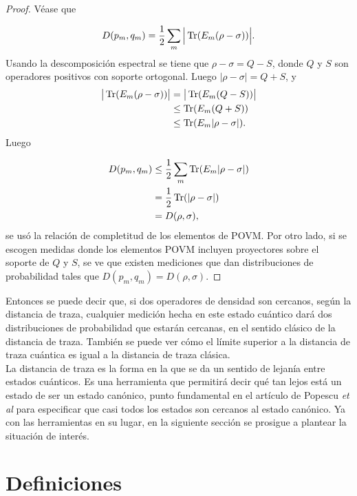\begin{proof}

Véase que 

\begin{equation}
D(p_{m},q_{m})= \frac{1}{2} \sum_{m} \Big|\Tr(E_{m}(\rho- \sigma)) \Big|.
\end{equation}
Usando la descomposición espectral se tiene que $\rho- \sigma=Q-S$, donde $Q$ y $S$ son operadores positivos con soporte ortogonal. Luego $|\rho - \sigma|= Q+S$, y
\begin{align}
\big|\Tr(E_{m}(\rho- \sigma)) \big| &= \big|\Tr(E_{m}(Q-S)) \big| \\
\quad &\leq \Tr(E_{m}(Q+S))\\
\quad &\leq \Tr(E_{m}|\rho -\sigma|).
\end{align}
Luego 

\begin{align}
D(p_{m},q_{m}) &\leq \frac{1}{2} \sum_{m} \Tr(E_{m}|\rho-\sigma|)\\
\quad &= \frac{1}{2} \Tr(|\rho -\sigma|)\\
\quad &= D(\rho,\sigma),
\end{align}
se usó la relación de completitud de los elementos de POVM. Por otro lado, si se escogen medidas donde los elementos POVM incluyen proyectores sobre el soporte de $Q$ y $S$, se ve que existen mediciones que dan distribuciones de probabilidad tales que $D(p_{m},q_{m})= D(\rho,\sigma)$.

\end{proof}
Entonces se puede decir que, si dos operadores de densidad son cercanos, según la distancia de traza, cualquier medición hecha en este estado cuántico dará dos distribuciones de probabilidad que estarán cercanas, en el sentido clásico de la distancia de traza. También se puede ver cómo el límite superior a la distancia de traza cuántica es igual a la distancia de traza clásica.
\\
La distancia de traza es la forma en la que se da un sentido de lejanía entre estados cuánticos. Es una herramienta que permitirá decir qué tan lejos está un estado de ser un estado canónico, punto fundamental en el artículo de Popescu \textit{et al} para especificar que casi todos los estados son cercanos al estado canónico. Ya con las herramientas en su lugar, en la siguiente sección se prosigue a plantear la situación de interés.

\section{Definiciones}

